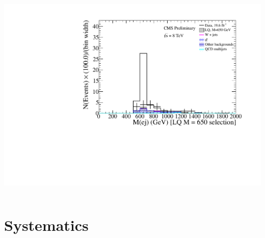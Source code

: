\documentclass[bigger]{beamer}
\begin{document}
\begin{frame}
\begin{columns}
\begin{column}{0.6\textwidth}
\centering
\mej
\includegraphics[width=\textwidth]{fig/enu/finalSelection/Mej_LQ650_enujj.pdf}
\end{column}
\end{columns}
\end{frame}
\section{Systematics}
\label{sec-4}
\end{document}
